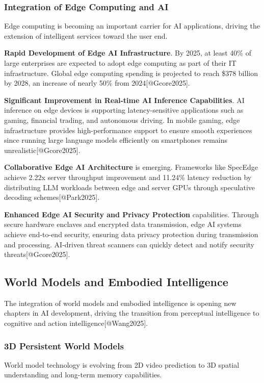 \documentclass{article}
\begin{document}
\subsubsection{Integration of Edge Computing and AI}
Edge computing is becoming an important carrier for AI applications, driving the extension of intelligent services toward the user end.

\textbf{Rapid Development of Edge AI Infrastructure}. By 2025, at least 40\% of large enterprises are expected to adopt edge computing as part of their IT infrastructure. Global edge computing spending is projected to reach \$378 billion by 2028, an increase of nearly 50\% from 2024[@Gcore2025].

\textbf{Significant Improvement in Real-time AI Inference Capabilities}. AI inference on edge devices is supporting latency-sensitive applications such as gaming, financial trading, and autonomous driving. In mobile gaming, edge infrastructure provides high-performance support to ensure smooth experiences since running large language models efficiently on smartphones remains unrealistic[@Gcore2025].

\textbf{Collaborative Edge AI Architecture} is emerging. Frameworks like SpecEdge achieve 2.22x server throughput improvement and 11.24\% latency reduction by distributing LLM workloads between edge and server GPUs through speculative decoding schemes[@Park2025].

\textbf{Enhanced Edge AI Security and Privacy Protection} capabilities. Through secure hardware enclaves and encrypted data transmission, edge AI systems achieve end-to-end security, ensuring data privacy protection during transmission and processing. AI-driven threat scanners can quickly detect and notify security threats[@Gcore2025].

\subsection{World Models and Embodied Intelligence}
The integration of world models and embodied intelligence is opening new chapters in AI development, driving the transition from perceptual intelligence to cognitive and action intelligence[@Wang2025].

\subsubsection{3D Persistent World Models}
World model technology is evolving from 2D video prediction to 3D spatial understanding and long-term memory capabilities.
\end{document}
